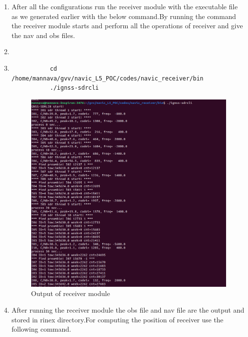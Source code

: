 \begin{enumerate}
        \item After all the configurations run the receiver module with the executable file as we generated earlier with the below command.By running the command the receiver module starts and perform all the operations of receiver and give the nav and obs files.
        \item[]
        \item[]
        \begin{lstlisting}
           cd /home/mannava/gvv/navic_L5_POC/codes/navic_receiver/bin
           ./ignss-sdrcli
        \end{lstlisting}
        \begin{normalsize}
            \begin{figure}[!ht]
                \centering
                \includegraphics[width=1\textwidth]{figs/rx_execute.png}
                \centering
                \captionsetup{justification=centering}
                \caption{Output of receiver module}
                \end{figure}
            \end{normalsize}
        \item After running the receiver module the obs file and nav file are the output and stored in rinex directory.For computing the position of receiver use the following command.
        \begin{lstlisting}

\end{lstlisting}
\end{enumerate}
